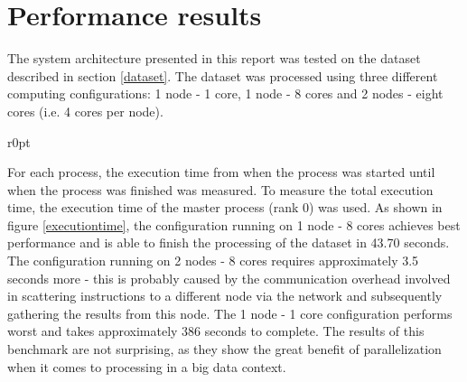 \documentclass[paper=a4, fontsize=11pt]{scrartcl}
\numberwithin{equation}{section}		%
\numberwithin{figure}{section}			%
\numberwithin{table}{section}				%
\begin{document}
\section{Performance results}
The system architecture presented in this report was tested on the dataset described in section \ref{dataset}. The dataset was processed using three different computing configurations: 1 node - 1 core, 1 node - 8 cores and 2 nodes - eight cores (i.e. 4 cores per node).
\begin{wrapfigure}{r}{0pt}
\label{executiontime}
\caption{Performance benchmark}
\end{wrapfigure}
For each process, the execution time from when the process was started until when the process was finished was measured. To measure the total execution time, the execution time of the master process (rank 0) was used.
\newline
As shown in figure \ref{executiontime}, the configuration running on 1 node - 8 cores achieves best performance and is able to finish the processing of the dataset in 43.70 seconds. The configuration running on 2 nodes - 8 cores requires approximately 3.5 seconds more - this is probably caused by the communication overhead involved in scattering instructions to a different node via the network and subsequently gathering the results from this node. The 1 node - 1 core configuration performs worst and takes approximately 386 seconds to complete. The results of this benchmark are not surprising, as they show the great benefit of parallelization when it comes to processing in a big data context.
\end{document}
